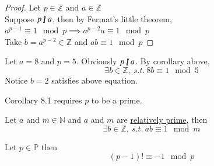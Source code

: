 \documentclass[10pt]{article}
\begin{document}
	\begin{proof}
		Let $p \in \mathbb{Z}$ and $a \in \mathbb{Z}$ \\
		Suppose $p \centernot | a$, then by Fermat's little theorem, \\
		$a^{p-1} \equiv 1 \mod p \implies a^{p-2}a \equiv 1 \mod p$ \\
		Take $b = a^{p-2} \in \mathbb{Z}$ and $ab \equiv 1 \mod p$
	\end{proof}
	
	\begin{example}
		Let $a=8$ and $p=5$. Obviously $p \centernot | a$. By corollary above, 
		\[
			\exists b \in \mathbb{Z},\ s.t.\ 8b \equiv 1 \mod 5
		\]
		Notice $b=2$ satisfies above equation.
	\end{example}
	
	\begin{remark}
		Corollary 8.1 requires $p$ to be a prime.
	\end{remark}
	
	\begin{corollary}[Generalization]
		Let $a$ and $m \in \mathbb{N}$ and $a$ and $m$ are \ul{relatively prime}, then 
		\[
			\exists b \in \mathbb{Z},\ s.t.\ ab \equiv 1 \mod m
		\]
	\end{corollary}
	
	\begin{theorem}
		Let $p \in \mathbb{P}$ then
		\[
			(p-1)! \equiv -1 \mod p 
		\]
	\end{theorem}
	
\end{document}
